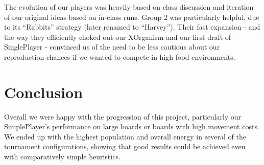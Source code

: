 \documentclass[
10pt, %
letterpaper, %
oneside, %
headinclude,footinclude, %
english
]{article}
\begin{document}
The evolution of our players was heavily based on class discussion and iteration of our original ideas based on in-class runs. Group 2 was particularly helpful, due to its ``Rabbits'' strategy (later renamed to ``Harvey''). Their fast expansion - and the way they efficiently choked out our XOrganism and our first draft of SinglePlayer - convinced us of the need to be less cautious about our reproduction chances if we wanted to compete in high-food environments.

\section{Conclusion}

Overall we were happy with the progression of this project, particularly our SimplePlayer's performance on large boards or boards with high movement costs. We ended up with the highest population and overall energy in several of the tournament configurations, showing that good results could be achieved even with comparatively simple heuristics.
\end{document}
